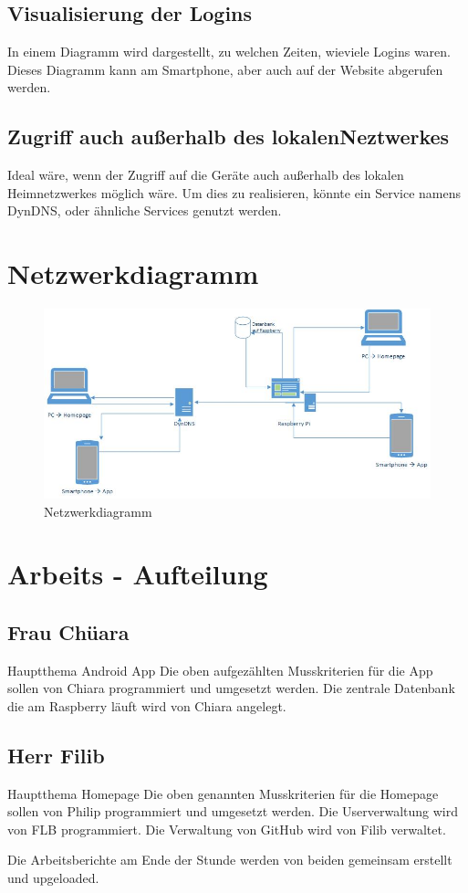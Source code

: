 \documentclass[10pt,a4paper]{report}
\begin{document}
\subsection{Visualisierung der Logins}
In einem Diagramm wird dargestellt, zu welchen Zeiten, wieviele Logins waren. Dieses Diagramm kann am Smartphone, aber auch auf der Website abgerufen werden.

\subsection{Zugriff auch außerhalb des lokalenNeztwerkes}
Ideal wäre, wenn der Zugriff auf die Geräte auch außerhalb des lokalen Heimnetzwerkes möglich wäre. Um dies zu realisieren, könnte ein Service namens DynDNS, oder ähnliche Services genutzt werden. 

\section{Netzwerkdiagramm}
\begin{figure}[ht]
	\centering
  	\includegraphics[width=1\textwidth]{netzwerkdiagramm.jpg}
	\caption{Netzwerkdiagramm}
	\label{netzwerkdiagramm}
\end{figure}

\section{Arbeits - Aufteilung}
\subsection{Frau Chüara}
Hauptthema Android App
Die oben aufgezählten Musskriterien für die App sollen von Chiara programmiert und umgesetzt werden.
Die zentrale Datenbank die am Raspberry läuft wird von Chiara angelegt.
\subsection{Herr Filib}
Hauptthema Homepage
Die oben genannten Musskriterien für die Homepage sollen von Philip programmiert und umgesetzt werden.
Die Userverwaltung wird von FLB programmiert.
Die Verwaltung von GitHub wird von Filib verwaltet.

\bigskip 
Die Arbeitsberichte am Ende der Stunde werden von beiden gemeinsam erstellt und upgeloaded.
\end{document}
